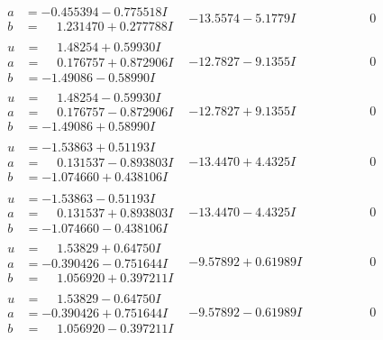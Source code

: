 \documentclass[1p]{elsarticle_modified}
\theoremstyle{definition}
\begin{document}
$$\begin{array}{c|c|c}
\begin{aligned}
a &= -0.455394 - 0.775518 I \\
b &= \phantom{-}1.231470 + 0.277788 I\end{aligned}
 & -13.5574 - 5.1779 I & \phantom{-0.000000 } 0 \\ \hline\begin{aligned}
u &= \phantom{-}1.48254 + 0.59930 I \\
a &= \phantom{-}0.176757 + 0.872906 I \\
b &= -1.49086 - 0.58990 I\end{aligned}
 & -12.7827 - 9.1355 I & \phantom{-0.000000 } 0 \\ \hline\begin{aligned}
u &= \phantom{-}1.48254 - 0.59930 I \\
a &= \phantom{-}0.176757 - 0.872906 I \\
b &= -1.49086 + 0.58990 I\end{aligned}
 & -12.7827 + 9.1355 I & \phantom{-0.000000 } 0 \\ \hline\begin{aligned}
u &= -1.53863 + 0.51193 I \\
a &= \phantom{-}0.131537 - 0.893803 I \\
b &= -1.074660 + 0.438106 I\end{aligned}
 & -13.4470 + 4.4325 I & \phantom{-0.000000 } 0 \\ \hline\begin{aligned}
u &= -1.53863 - 0.51193 I \\
a &= \phantom{-}0.131537 + 0.893803 I \\
b &= -1.074660 - 0.438106 I\end{aligned}
 & -13.4470 - 4.4325 I & \phantom{-0.000000 } 0 \\ \hline\begin{aligned}
u &= \phantom{-}1.53829 + 0.64750 I \\
a &= -0.390426 - 0.751644 I \\
b &= \phantom{-}1.056920 + 0.397211 I\end{aligned}
 & -9.57892 + 0.61989 I & \phantom{-0.000000 } 0 \\ \hline\begin{aligned}
u &= \phantom{-}1.53829 - 0.64750 I \\
a &= -0.390426 + 0.751644 I \\
b &= \phantom{-}1.056920 - 0.397211 I\end{aligned}
 & -9.57892 - 0.61989 I & \phantom{-0.000000 } 0 \\ \hline\begin{aligned}

\end{aligned}
\end{array}$$
\end{document}
